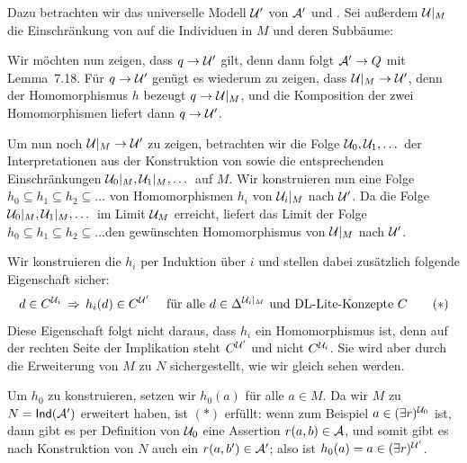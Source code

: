 \documentclass[fontsize=11pt, twoside=false, numbers=autoenddot]{scrbook}
\begin{document}
Dazu betrachten wir das universelle Modell $\mathcal{U}'$ von $\mathcal{A}'$ und \Tmc.
Sei außerdem $\mathcal{U}|_M$ die Einschränkung von \Umc 
auf die Individuen in $M$ und deren Subbäume:
%
\begin{center}
\end{center}
%
Wir möchten nun zeigen, dass $q \to \mathcal{U}'$ gilt,
denn dann folgt $\mathcal{A}' \to Q$ mit Lemma~7.18.
Für $q \to \mathcal{U}'$ genügt es wiederum zu zeigen,
dass $\mathcal{U}|_M \to \mathcal{U}'$,
denn der Homomorphismus $h$ bezeugt $q \to \mathcal{U}|_M$,
und die Komposition der zwei Homomorphismen liefert dann $q \to \mathcal{U}'$.

Um nun noch $\mathcal{U}|_M \to \mathcal{U}'$ zu zeigen,
betrachten wir die Folge $\mathcal{U}_0,\mathcal{U}_1,\dots$ der Interpretationen
aus der Konstruktion von \Umc sowie die entsprechenden Einschränkungen
$\mathcal{U}_0|_M,\mathcal{U}_1|_M,\dots$ auf $M$.
Wir konstruieren nun eine Folge $h_0 \subseteq h_1 \subseteq h_2 \subseteq \dots$
von Homomorphismen $h_i$ von $\mathcal{U}_i|_M$ nach $\mathcal{U}'$.
Da die Folge $\mathcal{U}_0|_M,\mathcal{U}_1|_M,\dots$ im Limit $\mathcal{U}_M$ erreicht,
liefert das Limit der Folge $h_0 \subseteq h_1 \subseteq h_2 \subseteq \dots$den gewünschten Homomorphismus
von $\mathcal{U}|_M$ nach $\mathcal{U}'$.

Wir konstruieren die $h_i$ per Induktion über $i$ und stellen dabei zusätzlich
folgende Eigenschaft sicher:
%
\[
  d \in C^{\mathcal{U}_i} \,\Rightarrow\, h_i(d) \in C^{\mathcal{U}'}\quad \text{~für alle~} d \in \Delta^{\mathcal{U}_i|_M} \text{~und DL-Lite-Konzepte~} C
  \tag{$*$}
\]
%
Diese Eigenschaft folgt nicht daraus, dass $h_i$ ein Homomorphismus ist,
denn auf der rechten Seite der Implikation steht $C^{\mathcal{U}'}$ und nicht $C^{\mathcal{U}_i}$.
Sie wird aber durch die Erweiterung von $M$ zu $N$ sichergestellt,
wie wir gleich sehen werden.

Um $h_0$ zu konstruieren, setzen wir $h_0(a)$ für alle $a \in M$.
Da wir $M$ zu $N = \textsf{Ind}(\mathcal{A}')$ erweitert haben,
ist $(*)$ erfüllt: wenn zum Beispiel $a \in (\exists r)^{\mathcal{U}_0}$ ist,
dann gibt es per Definition von $\mathcal{U}_0$ eine Assertion $r(a,b) \in \mathcal{A}$,
und somit gibt es nach Konstruktion von $N$ auch ein $r(a,b') \in \mathcal{A}'$;
also ist $h_0(a) = a \in (\exists r)^{\mathcal{U}'}$.
\end{document}
